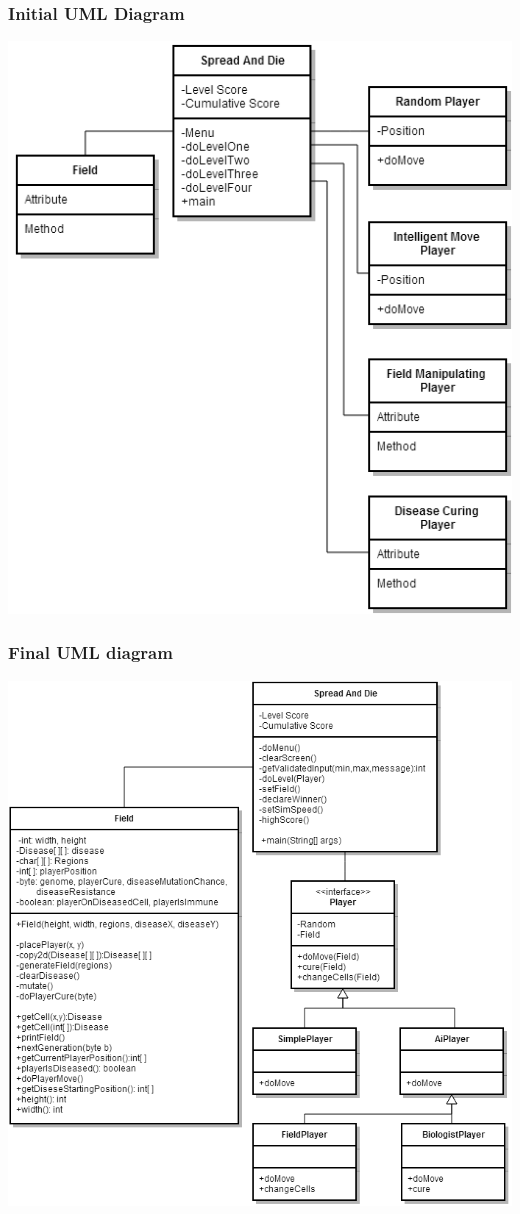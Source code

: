 \documentclass[pdftex,12pt,a4paper]{article}
\begin{document}
		\subsubsection{Initial UML Diagram}
			\includegraphics[width=\linewidth]{./fig1.png}
		\subsubsection{Final UML diagram}
			\includegraphics[width=\linewidth]{./fig2.png}
\end{document}
